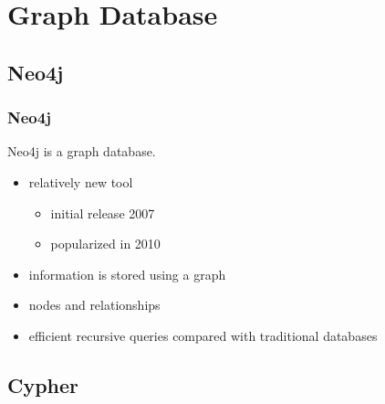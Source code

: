\documentclass{beamer}
\begin{document}
\section[Graph DB]{Graph Database}
\subsection{Neo4j}

\begin{frame}
	\frametitle{Neo4j}
	
	Neo4j is a graph database.
		\begin{itemize}
		\item relatively new tool
			\begin{itemize}
			\item initial release 2007
			\item popularized in 2010
			\end{itemize}
		\item information is stored using a graph
		\item nodes and relationships
		\item efficient recursive queries compared with traditional databases
		\end{itemize}

\end{frame}

\subsection{Cypher}
\end{document}
